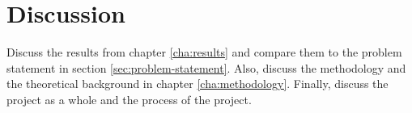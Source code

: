\chapter{Discussion}\label{cha:discussion}
Discuss the results from chapter \ref{cha:results} and compare them to the problem statement in section \ref{sec:problem-statement}. Also, discuss the methodology and the theoretical background in chapter \ref{cha:methodology}. Finally, discuss the project as a whole and the process of the project.